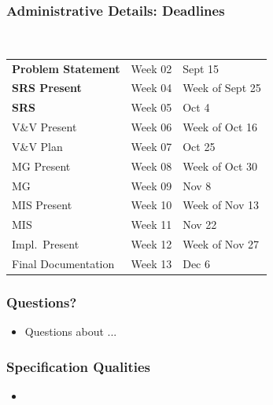 \documentclass[t,12pt,numbers,fleqn]{beamer}
\begin{document}
\begin{frame}
\frametitle{Administrative Details: Deadlines}
~\newline
\begin{tabular}{l l l}
\textbf{Problem Statement} & Week 02 & Sept 15\\
\textbf{SRS Present} & Week 04 & Week of Sept 25\\
\textbf{SRS} & Week 05 & Oct 4\\
V\&V Present & Week 06 & Week of Oct 16\\
V\&V Plan & Week 07 & Oct 25\\
MG Present & Week 08 & Week of Oct 30\\
MG & Week 09 & Nov 8\\
MIS Present & Week 10 & Week of Nov 13\\
MIS & Week 11 & Nov 22\\
Impl.\ Present & Week 12 & Week of Nov 27\\
Final Documentation & Week 13 & Dec 6\\
\end {tabular}

\end{frame}


\begin{frame}
\frametitle{Questions?}
\begin{itemize}
\item Questions about ...
\end{itemize}
\end{frame}


\begin{frame}
\frametitle{Specification Qualities}

\begin{itemize}

\item {}

\end{itemize}

\end{frame}

\end{document}
